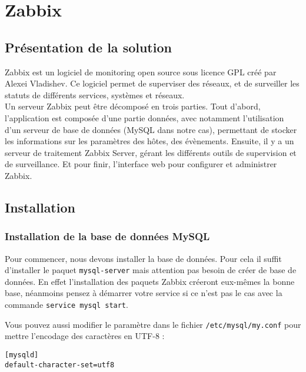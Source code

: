 \section{Zabbix}
	\subsection{Présentation de la solution}
		\vspace{0.3cm}
			
		Zabbix est un logiciel de monitoring open source sous licence GPL créé par Alexei Vladishev. Ce logiciel permet de superviser des réseaux, et de surveiller les statuts de différents services, systèmes et réseaux.\\

		Un serveur Zabbix peut être décomposé en trois parties. Tout d’abord, l’application est composée d’une partie données, avec notamment l’utilisation d’un serveur de base de données (MySQL dans notre cas), permettant de stocker les informations sur les paramètres des hôtes, des évènements. Ensuite, il y a un serveur de traitement Zabbix Server, gérant les différents outils de supervision et de surveillance. Et pour finir, l’interface web pour configurer et administrer Zabbix.\\

	\subsection{Installation}
		\subsubsection{Installation de la base de données MySQL}
			\vspace{0.3cm}

			Pour commencer, nous devons installer la base de données. Pour cela il suffit d'installer le paquet \verb?mysql-server? mais attention pas besoin de créer de base de données. En effet l'installation des paquets Zabbix créeront eux-mêmes la bonne base, néanmoins pensez à démarrer votre service si ce n'est pas le cas avec la commande \verb?service mysql start?.

			Vous pouvez aussi modifier le paramètre dans le fichier \verb?/etc/mysql/my.conf? pour mettre l'encodage des caractères en UTF-8 :
			
			\begin{verbatim}
[mysqld]
default-character-set=utf8

			\end{verbatim}

